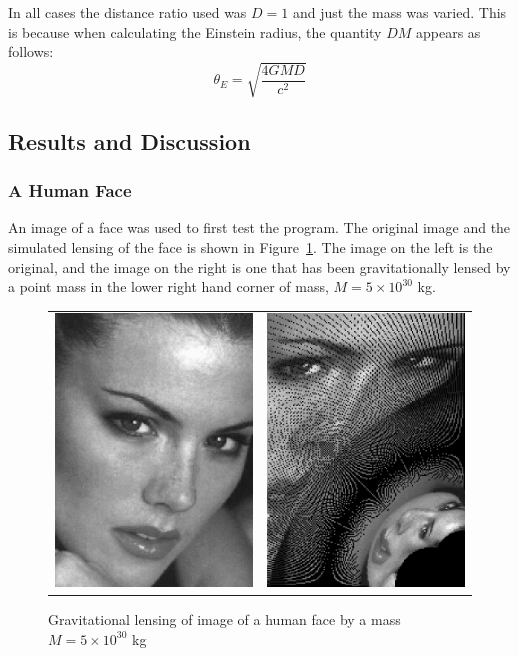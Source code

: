 \documentclass[aspectratio=1610,xcolor=dvipsnames,t]{beamer}
\begin{document}
    In all cases the distance ratio used was $D = 1$ and just the mass
    was varied. This is because when calculating the Einstein radius,
    the quantity $DM$ appears as follows:
    \begin{equation}
        \theta_E = \sqrt{\frac{4GMD}{c^2}}
    \end{equation}

\subsection{Results and Discussion}

\subsubsection{A Human Face}
An image of a face was used to first test the program. 
The original image and the simulated lensing of the face is shown
in Figure~\ref{fig:face}.  The image on the
left is the original, and the image on the right is one that has been
gravitationally lensed by a point mass in the lower right hand corner
of mass, $M = 5 \times 10^{30}$ kg.

\begin{figure}
    \caption{Gravitational lensing of image of a human face by a mass $M = 5 \times 10^{30}$ kg} 
    \label{fig:face} 
    \begin{center}
    \begin{tabular}{cc}
        \includegraphics[width=0.4\columnwidth]{pics/kr.eps} &
        \includegraphics[width=0.4\columnwidth]{pics/kr_5e30.eps} \\
    \end{tabular}
    \end{center}
\end{figure} 
\end{document}
